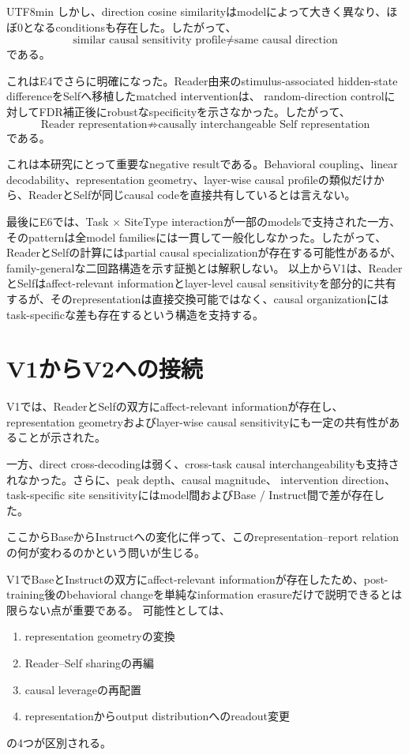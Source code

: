 \documentclass{article} %
\begin{document}
\begin{CJK*}{UTF8}{min}
しかし、direction cosine similarityはmodelによって大きく異なり、ほぼ0となるconditionsも存在した。したがって、
\[
\text{similar causal sensitivity profile}
\neq
\text{same causal direction}
\]
である。

これはE4でさらに明確になった。Reader由来のstimulus-associated hidden-state differenceをSelfへ移植したmatched interventionは、
random-direction controlに対してFDR補正後にrobustなspecificityを示さなかった。したがって、
\[
\text{Reader representation}
\not\Rightarrow
\text{causally interchangeable Self representation}
\]
である。

これは本研究にとって重要なnegative resultである。Behavioral coupling、linear decodability、representation geometry、layer-wise causal profileの類似だけから、ReaderとSelfが同じcausal codeを直接共有しているとは言えない。

最後にE6では、Task \(\times\) SiteType interactionが一部のmodelsで支持された一方、そのpatternは全model familiesには一貫して一般化しなかった。したがって、ReaderとSelfの計算にはpartial causal specializationが存在する可能性があるが、family-generalな二回路構造を示す証拠とは解釈しない。
以上からV1は、ReaderとSelfはaffect-relevant informationとlayer-level causal sensitivityを部分的に共有するが、そのrepresentationは直接交換可能ではなく、causal organizationにはtask-specificな差も存在するという構造を支持する。



\section{V1からV2への接続}
\label{sec:v1-to-v2}

V1では、ReaderとSelfの双方にaffect-relevant informationが存在し、representation geometryおよびlayer-wise causal sensitivityにも一定の共有性があることが示された。

一方、direct cross-decodingは弱く、cross-task causal interchangeabilityも支持されなかった。さらに、peak depth、causal magnitude、
intervention direction、task-specific site sensitivityにはmodel間およびBase / Instruct間で差が存在した。

ここからBaseからInstructへの変化に伴って、このrepresentation--report relationの何が変わるのかという問いが生じる。

V1でBaseとInstructの双方にaffect-relevant informationが存在したため、post-training後のbehavioral changeを単純なinformation erasureだけで説明できるとは限らない点が重要である。
可能性としては、
\begin{enumerate}
    \item representation geometryの変換
    \item Reader--Self sharingの再編
    \item causal leverageの再配置
    \item representationからoutput distributionへのreadout変更
\end{enumerate}
の4つが区別される。


\end{CJK*}
\end{document}
